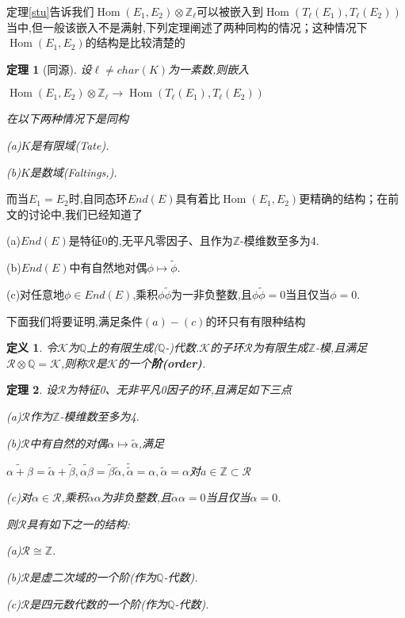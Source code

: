 \documentclass[11pt]{ctexart}
\DeclareMathOperator{\Hom}{Hom}
\newtheorem{thm}{定理}[section]
\newtheorem{defi}{定义}[section]
\begin{document}
定理\ref{stu}告诉我们$\Hom(E_1,E_2)\otimes \mathbb{Z}_{\ell} $可以被嵌入到$\Hom(T_{\ell}(E_1),T_{\ell}(E_2)) $当中,但一般该嵌入不是满射,下列定理阐述了两种同构的情况；这种情况下$\Hom(E_1,E_2)$的结构是比较清楚的

\begin{thm}[同源]设$\ell \neq char(K)$为一素数,则嵌入
    \begin{center}
        $\Hom(E_1,E_2)\otimes \mathbb{Z}_{\ell} \longrightarrow \Hom(T_{\ell}(E_1),T_{\ell}(E_2)) $
    \end{center}

\noindent 在以下两种情况下是同构

(a)$K$是有限域(Tate\cite{Tate}).

(b)$K$是数域(Faltings\cite{Faltings1},\cite{Faltings3}).

\end{thm}

而当$E_1=E_2$时,自同态环$End(E)$具有着比$\Hom(E_1,E_2)$更精确的结构；在前文的讨论中,我们已经知道了

(a)$End(E)$是特征0的,无平凡零因子、且作为$\mathbb{Z}$-模维数至多为4.

(b)$End(E)$中有自然地对偶$\phi \mapsto \widetilde{\phi}$.

(c)对任意地$\phi \in End(E)$,乘积$\phi \widetilde{\phi}$为一非负整数,且$\phi \widetilde{\phi}=0$当且仅当$\phi=0$.

\noindent 下面我们将要证明,满足条件$(a)-(c)$的环只有有限种结构
\begin{defi}令$\mathcal{K}$为$\mathbb{Q}$上的有限生成($\mathbb{Q}$-)代数.$\mathcal{K}$的子环$\mathcal{R}$为有限生成$\mathbb{Z}$-模,且满足$\mathcal{R}\otimes \mathbb{Q}=\mathcal{K}$,则称$\mathcal{R}$是$\mathcal{K}$的一个\textbf{阶(order)}.

\end{defi}

\begin{thm}设$\mathcal{R}$为特征0、无非平凡0因子的环,且满足如下三点

    (a)$\mathcal{R}$作为$\mathbb{Z}$-模维数至多为4.

    (b)$\mathcal{R}$中有自然的对偶$\alpha \mapsto \widetilde{\alpha}$,满足
    \begin{center}
        $\widetilde{\alpha+\beta}=\widetilde{\alpha}+\widetilde{\beta}$$,\widetilde{\alpha\beta}=\widetilde{\beta}\widetilde{\alpha}$$,\widetilde{\widetilde{\alpha}}=\alpha$$,\widetilde{\alpha}=\alpha$对$a\in \mathbb{Z} \subset \mathcal{R}$
    \end{center}

    (c)对$\alpha \in \mathcal{R}$,乘积$\widetilde{\alpha}\alpha$为非负整数,且$\widetilde{\alpha}\alpha=0$当且仅当$\alpha=0$.

    \noindent 则$\mathcal{R}$具有如下之一的结构:

    (a)$\mathcal{R} \cong \mathbb{Z}$.

    (b)$\mathcal{R}$是虚二次域的一个阶(作为$\mathbb{Q}$-代数).

    (c)$\mathcal{R}$是四元数代数的一个阶(作为$\mathbb{Q}$-代数).

\end{thm}
\end{document}
